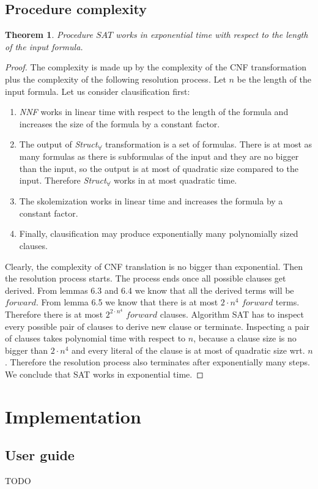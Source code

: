 \documentclass[english, shortabstract]{iithesis}
\theoremstyle{definition} \newtheorem{definition}{Definition}[chapter]
\theoremstyle{remark} \newtheorem{remark}[definition]{Observation}
\theoremstyle{plain} \newtheorem{theorem}[definition]{Theorem}
\theoremstyle{plain} \newtheorem{lemma}[definition]{Lemma}
\begin{document}
\section{Procedure complexity}

\begin{theorem}
Procedure $SAT$ works in exponential time with respect to the length of the input formula. 
\end{theorem}

\begin{proof}
The complexity is made up by the complexity of the CNF transformation plus the complexity of the following resolution process.
Let $n$ be the length of the input formula.
Let us consider clausification first:
\begin{enumerate}
    \item \emph{NNF} works in linear time with respect to the length of the formula and increases the size of the formula by a constant factor.
    \item The output of \emph{Struct\textsubscript{{$\forall$}}} transformation is a set of formulas. There is at most as many formulas as there is 
    subformulas of the input and they are no bigger than the input, so the output is at most of quadratic size compared to the input.
    Therefore \emph{Struct\textsubscript{{$\forall$}}} works in at most quadratic time.
    \item The skolemization works in linear time and increases the formula by a constant factor.
    \item Finally, clausification may produce exponentially many polynomially sized clauses.
\end{enumerate}
Clearly, the complexity of CNF translation is no bigger than exponential.
Then the resolution process starts. The process ends once all possible clauses get derived.
From lemmas 6.3 and 6.4 we know that all the derived terms will be $forward$.
From lemma 6.5 we know that there is at most $2\cdot n^4$ $forward$ terms.
Therefore there is at most $2^{2\cdot n^4}$ $forward$ clauses. 
Algorithm SAT has to inspect every possible pair of clauses to derive new clause or terminate.
Inspecting a pair of clauses takes polynomial time with respect to $n$, because 
a clause size is no bigger than $2\cdot n^4$ and every literal of the clause is at most of quadratic size wrt. $n$.
Therefore the resolution process also terminates after exponentially many steps.
We conclude that SAT works in exponential time.
\end{proof}

\chapter{Implementation}

\section{User guide}

TODO


\end{document}
